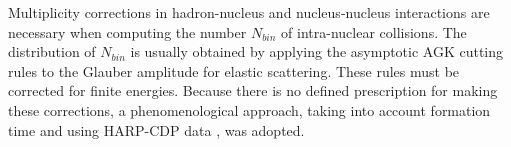 
Multiplicity corrections in hadron-nucleus and nucleus-nucleus interactions are 
necessary when computing the number $N_{bin}$ of intra-nuclear collisions.  The
distribution of $N_{bin}$ is usually obtained by applying the asymptotic AGK 
cutting rules \cite{hadbib:FTF16} to the Glauber amplitude for elastic 
scattering.  These rules must be corrected for finite energies. Because there is
no defined prescription for making these corrections, a phenomenological 
approach, taking into account formation time and using HARP-CDP data 
\cite{hadbib:FTF17}, was adopted.

